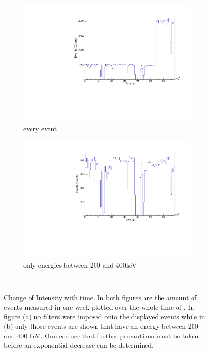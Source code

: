 \begin{figure}[t!]
	\centering
	\begin{subfigure}{.5\textwidth}
		\centering
		\includegraphics[width=.\textwidth]{./Bilder/ZeitverlaufALLE.pdf}
		\caption{every event}
		\label{fig:ZeitAll}
	\end{subfigure}%
	\begin{subfigure}{.5\textwidth}
		\centering
		\includegraphics[width=\textwidth]{./Bilder/ZeitverlaufLimits.pdf}
		\caption{only energies between 200 and 400keV}
		\label{fig:ZeitLimits}
	\end{subfigure}
    \\
	\vspace{0.5cm}
    \caption{Change of Intensity with time. In both figures are the amount of events measured in one week plotted over the whole time of \PII. In figure (a) no filters were imposed onto the displayed events while in (b) only those events are shown that have an energy between 200 and 400 keV. One can see that further precautions must be taken before an exponential decrease can be determined. }
\vspace{0.5cm}
\end{figure}
\\

